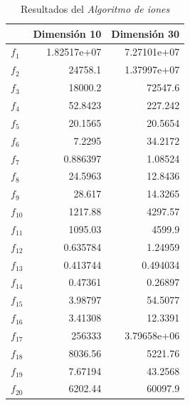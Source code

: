 \documentclass[a4paper,11pt]{article}
\begin{document}
 
  \begin{table}[H]	
  \caption{Resultados del \textit{Algoritmo de iones}}
  \centering
  \begin{tabular}{|l|r|r|}
  \hline
  &  \textbf{Dimensión 10}& \textbf{Dimensión 30} \\ \hline
  $f_1$ &  1.82517e+07 &  7.27101e+07 \\ \hline
  $f_2$ &  24758.1 &  1.37997e+07 \\ \hline
  $f_3$ &  18000.2 &  72547.6 \\ \hline
  $f_4$ &  52.8423 & 227.242 \\ \hline
  $f_5$ &  20.1565 &  20.5654 \\ \hline
  $f_6$ &  7.2295 &  34.2172 \\ \hline
  $f_7$ &  0.886397 &  1.08524 \\ \hline
  $f_8$ &  24.5963 & 12.8436 \\ \hline
  $f_9$ &  28.617 & 14.3265\\ \hline
  $f_{10}$ &  1217.88 &  4297.57 \\ \hline
  $f_{11}$ &  1095.03 &  4599.9 \\ \hline
  $f_{12}$ &  0.635784 &  1.24959 \\ \hline
  $f_{13}$ &  0.413744 &  0.494034 \\ \hline
  $f_{14}$ &  0.47361 &  0.26897 \\ \hline
  $f_{15}$ &  3.98797 &  54.5077 \\ \hline
  $f_{16}$ &  3.41308 &  12.3391 \\ \hline
  $f_{17}$ &  256333  &  3.79658e+06 \\ \hline
  $f_{18}$ &  8036.56 &  5221.76 \\ \hline
  $f_{19}$ &  7.67194 &  43.2568 \\ \hline
  $f_{20}$ &  6202.44 &  60097.9 \\ \hline
\end{tabular}
  
  \label{ion-results}
  \end{table}
\end{document}
